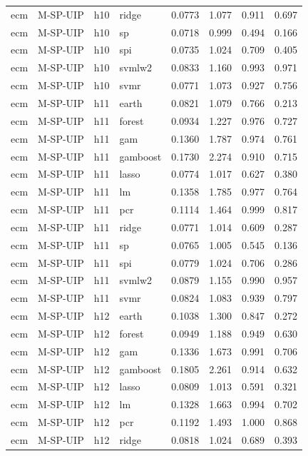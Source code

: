 \begin{ThreePartTable}
\begin{longtable}[t]{llclcccc}
ecm & M-SP-UIP & h10 & ridge & 0.0773 & 1.077 & 0.911 & 0.697\\
ecm & M-SP-UIP & h10 & sp & 0.0718 & 0.999 & 0.494 & 0.166\\
ecm & M-SP-UIP & h10 & spi & 0.0735 & 1.024 & 0.709 & 0.405\\
ecm & M-SP-UIP & h10 & svmlw2 & 0.0833 & 1.160 & 0.993 & 0.971\\
ecm & M-SP-UIP & h10 & svmr & 0.0771 & 1.073 & 0.927 & 0.756\\
\addlinespace
ecm & M-SP-UIP & h11 & earth & 0.0821 & 1.079 & 0.766 & 0.213\\
ecm & M-SP-UIP & h11 & forest & 0.0934 & 1.227 & 0.976 & 0.727\\
ecm & M-SP-UIP & h11 & gam & 0.1360 & 1.787 & 0.974 & 0.761\\
ecm & M-SP-UIP & h11 & gamboost & 0.1730 & 2.274 & 0.910 & 0.715\\
ecm & M-SP-UIP & h11 & lasso & 0.0774 & 1.017 & 0.627 & 0.380\\
ecm & M-SP-UIP & h11 & lm & 0.1358 & 1.785 & 0.977 & 0.764\\
ecm & M-SP-UIP & h11 & pcr & 0.1114 & 1.464 & 0.999 & 0.817\\
ecm & M-SP-UIP & h11 & ridge & 0.0771 & 1.014 & 0.609 & 0.287\\
ecm & M-SP-UIP & h11 & sp & 0.0765 & 1.005 & 0.545 & 0.136\\
ecm & M-SP-UIP & h11 & spi & 0.0779 & 1.024 & 0.706 & 0.286\\
ecm & M-SP-UIP & h11 & svmlw2 & 0.0879 & 1.155 & 0.990 & 0.957\\
ecm & M-SP-UIP & h11 & svmr & 0.0824 & 1.083 & 0.939 & 0.797\\
\addlinespace
ecm & M-SP-UIP & h12 & earth & 0.1038 & 1.300 & 0.847 & 0.272\\
ecm & M-SP-UIP & h12 & forest & 0.0949 & 1.188 & 0.949 & 0.630\\
ecm & M-SP-UIP & h12 & gam & 0.1336 & 1.673 & 0.991 & 0.706\\
ecm & M-SP-UIP & h12 & gamboost & 0.1805 & 2.261 & 0.914 & 0.632\\
ecm & M-SP-UIP & h12 & lasso & 0.0809 & 1.013 & 0.591 & 0.321\\
ecm & M-SP-UIP & h12 & lm & 0.1328 & 1.663 & 0.994 & 0.702\\
ecm & M-SP-UIP & h12 & pcr & 0.1192 & 1.493 & 1.000 & 0.868\\
ecm & M-SP-UIP & h12 & ridge & 0.0818 & 1.024 & 0.689 & 0.393\\

\end{longtable}
\end{ThreePartTable}
